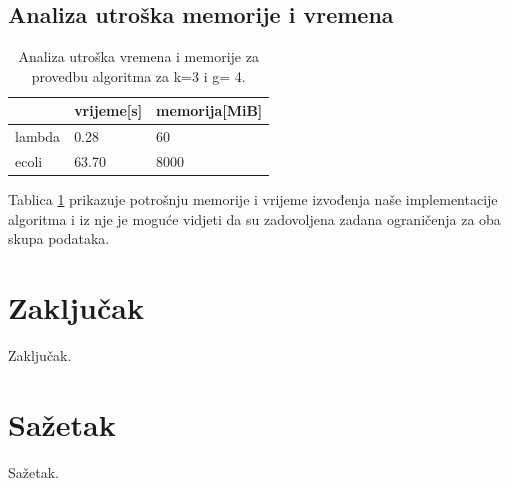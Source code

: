 \documentclass[times, utf8, seminar, numeric]{fer}
\begin{document}
\section{Analiza utroška memorije i vremena}
\begin{table}[htb]
	\centering
	\begin{tabular}{l|ll}
		& \multicolumn{1}{l}{vrijeme[s]} & memorija[MiB] \\ 	\hline
		lambda			& 0.28		& 60 	\\ 	\hline
		ecoli  			& 63.70     & 8000  \\	\hline
	\end{tabular}
	\caption{Analiza utroška vremena i memorije za provedbu algoritma za k=3 i g= 4.}
	\label{table:memorija}
\end{table}

Tablica \ref{table:memorija} prikazuje potrošnju memorije i vrijeme izvođenja naše implementacije algoritma i iz nje je moguće vidjeti da su zadovoljena zadana ograničenja za oba skupa podataka. 


\chapter{Zaključak}
Zaključak.




\chapter{Sažetak}
Sažetak.
\end{document}
